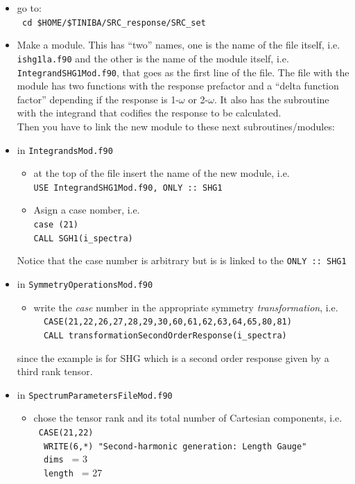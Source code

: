 \documentclass[12pt,leqno]{article}
\numberwithin{equation}{section}
\begin{document}
\begin{itemize}
\item go to:\\
\verb= cd $HOME/$TINIBA/SRC_response/SRC_set=  
\item Make a module. This has ``two'' names, one is the name of the
  file itself,
i.e. \verb=ishg1la.f90=
and the other is the name of the module itself,
i.e. \verb=IntegrandSHG1Mod.f90=,
 that goes as the first
line of the file.
The file with the module has two functions with the
response prefactor and a ``delta function factor'' depending if the
response is 1-$\omega$ or 2-$\omega$. It also has the subroutine with
the integrand that codifies the response to be calculated.\\
Then you have to link the new module to these next subroutines/modules: 

\item in \verb=IntegrandsMod.f90=
   \begin{itemize}
   \item at the top of the file insert the
     name of the new module, i.e. \\ \verb=USE IntegrandSHG1Mod.f90, ONLY :: SHG1= 
   \item Asign a case nomber, i.e.\\
     \verb=case (21)=\\
     \verb=CALL SGH1(i_spectra)=
   \end{itemize}
Notice that the case number is arbitrary but is is linked to the
\verb=ONLY :: SHG1= 

\item in \verb=SymmetryOperationsMod.f90=

\begin{itemize}

\item write the {\it case} number in the appropriate symmetry {\it transformation},
i.e. \\
\verb=  CASE(21,22,26,27,28,29,30,60,61,62,63,64,65,80,81)=\\
\verb=  CALL transformationSecondOrderResponse(i_spectra)=
     \end{itemize}
since the example is for SHG which is a second order response given by a third rank tensor.

\item in \verb=SpectrumParametersFileMod.f90=
      \begin{itemize}
      \item chose the tensor rank and its total number of Cartesian
        components, i.e.\\
\verb= CASE(21,22)= \\
\verb=  WRITE(6,*) "Second-harmonic generation: Length Gauge"=\\
\verb=  dims = = 3\\
\verb=  length = = 27
     \end{itemize}


\end{itemize}
\end{document}
